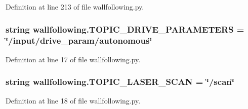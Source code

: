 Definition at line 213 of file wallfollowing.\+py.

\subsubsection[{\texorpdfstring{T\+O\+P\+I\+C\+\_\+\+D\+R\+I\+V\+E\+\_\+\+P\+A\+R\+A\+M\+E\+T\+E\+RS}{TOPIC_DRIVE_PARAMETERS}}]{\setlength{\rightskip}{0pt plus 5cm}string wallfollowing.\+T\+O\+P\+I\+C\+\_\+\+D\+R\+I\+V\+E\+\_\+\+P\+A\+R\+A\+M\+E\+T\+E\+RS = \char`\"{}/input/drive\+\_\+param/autonomous\char`\"{}}\hypertarget{namespacewallfollowing_a765ce45df7d0c3d9134fc83534029e36}{}\label{namespacewallfollowing_a765ce45df7d0c3d9134fc83534029e36}


Definition at line 17 of file wallfollowing.\+py.

\subsubsection[{\texorpdfstring{T\+O\+P\+I\+C\+\_\+\+L\+A\+S\+E\+R\+\_\+\+S\+C\+AN}{TOPIC_LASER_SCAN}}]{\setlength{\rightskip}{0pt plus 5cm}string wallfollowing.\+T\+O\+P\+I\+C\+\_\+\+L\+A\+S\+E\+R\+\_\+\+S\+C\+AN = \char`\"{}/scan\char`\"{}}\hypertarget{namespacewallfollowing_a7e38e617465ebdfa7ec0576ac63443f8}{}\label{namespacewallfollowing_a7e38e617465ebdfa7ec0576ac63443f8}


Definition at line 18 of file wallfollowing.\+py.

